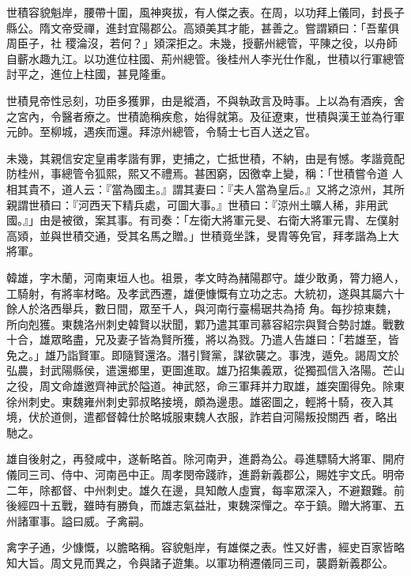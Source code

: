 \begin{pinyinscope}
 世積容貌魁岸，腰帶十圍，風神爽拔，有人傑之表。在周，以功拜上儀同，封長子縣公。隋文帝受禪，進封宜陽郡公。高熲美其才能，甚善之。嘗謂穎曰：「吾輩俱周臣子，社
 稷淪沒，若何？」熲深拒之。未幾，授蘄州總管，平陳之役，以舟師自蘄水趣九江。以功進位柱國、荊州總管。後桂州人李光仕作亂，世積以行軍總管討平之，進位上柱國，甚見隆重。



 世積見帝性忌刻，功臣多獲罪，由是縱酒，不與執政言及時事。上以為有酒疾，舍之宮內，令醫者療之。世積詭稱疾愈，始得就第。及征遼東，世積與漢王並為行軍元帥。至柳城，遇疾而還。拜涼州總管，令騎士七百人送之官。



 未幾，其親信安定皇甫孝諧有罪，吏捕之，亡抵世積，不納，由是有憾。孝諧竟配防桂州，事總管令狐熙，熙又不禮焉。甚困窮，因徼幸上變，稱：「世積嘗令道
 人相其貴不，道人云：『當為國主。』謂其妻曰：『夫人當為皇后。』又將之涼州，其所親謂世積曰：『河西天下精兵處，可圖大事。』世積曰：『涼州土曠人稀，非用武國。』」由是被徵，案其事。有司奏：「左衛大將軍元旻、右衛大將軍元胄、左僕射高熲，並與世積交通，受其名馬之贈。」世積竟坐誅，旻胄等免官，拜孝諧為上大將軍。



 韓雄，字木蘭，河南東垣人也。祖景，孝文時為赭陽郡守。雄少敢勇，膂力絕人，工騎射，有將率材略。及孝武西遷，雄便慷慨有立功之志。大統初，遂與其屬六十餘人於洛西舉兵，數日間，眾至千人，與河南行臺楊琚共為掎
 角。每抄掠東魏，所向剋獲。東魏洛州刺史韓賢以狀聞，鄴乃遣其軍司慕容紹宗與賢合勢討雄。戰數十合，雄眾略盡，兄及妻子皆為賢所獲，將以為戮。乃遣人告雄曰：「若雄至，皆免之。」雄乃詣賢軍。即隨賢還洛。潛引賢黨，謀欲襲之。事洩，遁免。謁周文於弘農，封武陽縣侯，遣還鄉里，更圖進取。雄乃招集義眾，從獨孤信入洛陽。芒山之役，周文命雄邀齊神武於隘道。神武怒，命三軍拜并力取雄，雄突圍得免。除東徐州刺史。東魏雍州刺史郭叔略接境，頗為邊患。雄密圖之，輕將十騎，夜入其境，伏於道側，遣都督韓仕於略城服東魏人衣服，詐若自河陽叛投關西
 者，略出馳之。



 雄自後射之，再發咸中，遂斬略首。除河南尹，進爵為公。尋進驃騎大將軍、開府儀同三司、侍中、河南邑中正。周孝閔帝踐祚，進爵新義郡公，賜姓宇文氏。明帝二年，除都督、中州刺史。雄久在邊，具知敵人虛實，每率眾深入，不避艱難。前後經四十五戰，雖時有勝負，而雄志氣益壯，東魏深憚之。卒于鎮。贈大將軍、五州諸軍事。謚曰威。子禽嗣。



 禽字子通，少慷慨，以膽略稱。容貌魁岸，有雄傑之表。性又好書，經史百家皆略知大旨。周文見而異之，令與諸子遊集。以軍功稍遷儀同三司，襲爵新義郡公。




\end{pinyinscope}
